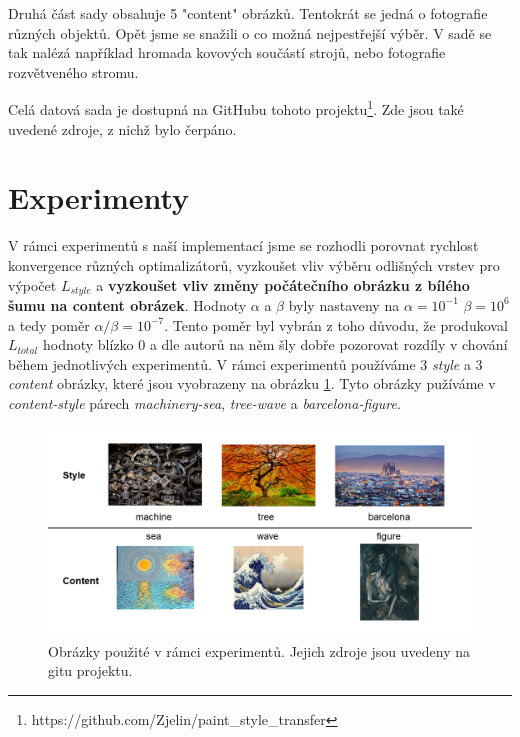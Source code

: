 \documentclass[twocolumn]{article}
\begin{document}
	Druhá část sady obsahuje 5 "content" obrázků. Tentokrát se jedná o fotografie různých objektů. Opět jsme se snažili o co možná nejpestřejší výběr. V sadě se tak nalézá například hromada kovových součástí strojů, nebo fotografie rozvětveného stromu.
	\par
	Celá datová sada je dostupná na GitHubu tohoto projektu\footnote{https://github.com/Zjelin/paint\_style\_transfer}. Zde jsou také uvedené zdroje, z nichž bylo čerpáno. 

	\section*{Experimenty}
	V rámci experimentů s naší implementací jsme se rozhodli porovnat rychlost konvergence různých optimalizátorů, vyzkoušet vliv výběru odlišných vrstev pro výpočet $L_{style}$ a \textbf{vyzkoušet vliv změny počátečního obrázku z bílého šumu na content obrázek}. Hodnoty $\alpha$ a $\beta$ byly nastaveny na $\alpha = 10^{-1}$ $\beta = 10^6$ a tedy poměr $\alpha / \beta = 10^{-7} $. Tento poměr byl vybrán z toho důvodu, že produkoval $L_{total}$ hodnoty blízko 0 a dle autorů na něm šly  dobře pozorovat rozdíly v chování během jednotlivých experimentů. V rámci experimentů používáme 3 \textit{style} a 3 \textit{content} obrázky, které jsou vyobrazeny na obrázku \ref{UsedFigs}. Tyto obrázky pužíváme v \textit{content-style} párech \textit{machinery-sea}, \textit{tree-wave} a \textit{barcelona-figure}.
	\begin{figure}[h]
		\includegraphics[width=\linewidth]{figs.png}
		\caption{Obrázky použité v rámci experimentů. Jejich zdroje jsou uvedeny na gitu projektu.}
		\label{UsedFigs}
	\end{figure}
	
	
\end{document}
